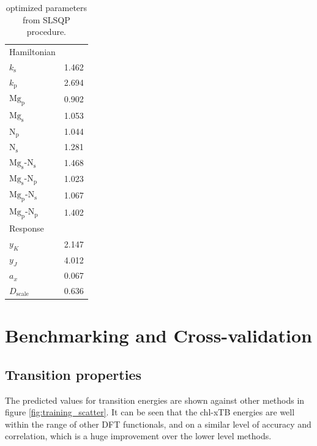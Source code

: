 \begin{table}
    \centering
    \begin{tabular}{|| l r ||}
    \hline
    Hamiltonian & \\
    $k_\text{s}$ & 1.462 \\
    $k_\text{p}$ & 2.694 \\

    $\text{Mg}_\text{p}$ & 0.902 \\
    $\text{Mg}_\text{s}$ & 1.053 \\
    $\text{N}_\text{p}$ & 1.044 \\
    $\text{N}_\text{s}$ & 1.281 \\

    $\text{Mg}_\text{s}$-$\text{N}_\text{s}$ & 1.468 \\
    $\text{Mg}_\text{s}$-$\text{N}_\text{p}$ & 1.023 \\
    $\text{Mg}_\text{p}$-$\text{N}_\text{s}$ & 1.067 \\
    $\text{Mg}_\text{p}$-$\text{N}_\text{p}$ & 1.402 \\

    \hline\hline
    Response & \\
    $y_K$ & 2.147 \\
    $y_J$ & 4.012 \\
    $a_x$ & 0.067 \\
    $D_{\text{scale}}$ & 0.636\\
    \hline
    \end{tabular}
    \caption{optimized parameters from SLSQP procedure.}
    \label{table:chl_params}
\end{table}

\section{Benchmarking and Cross-validation}
\label{sec:chl_benchmarking}

\subsection{Transition properties}
\label{subsec:transition_properties}

The predicted values for \Qy transition energies are shown against other methods
in figure \ref{fig:training_scatter}. It can be seen that the chl-xTB energies are
well within the range of other DFT functionals, and on a similar level of accuracy
and correlation, which is a huge improvement over the lower level methods.

